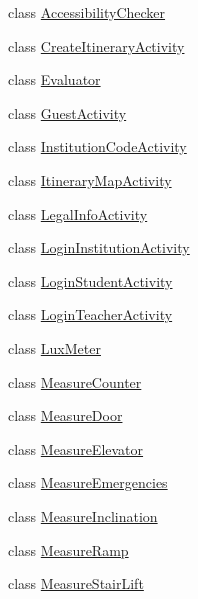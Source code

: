 \begin{DoxyCompactItemize}
\item 
class \mbox{\hyperlink{classcom_1_1osoc_1_1oncera_1_1_accessibility_checker}{Accessibility\+Checker}}
\item 
class \mbox{\hyperlink{classcom_1_1osoc_1_1oncera_1_1_create_itinerary_activity}{Create\+Itinerary\+Activity}}
\item 
class \mbox{\hyperlink{classcom_1_1osoc_1_1oncera_1_1_evaluator}{Evaluator}}
\item 
class \mbox{\hyperlink{classcom_1_1osoc_1_1oncera_1_1_guest_activity}{Guest\+Activity}}
\item 
class \mbox{\hyperlink{classcom_1_1osoc_1_1oncera_1_1_institution_code_activity}{Institution\+Code\+Activity}}
\item 
class \mbox{\hyperlink{classcom_1_1osoc_1_1oncera_1_1_itinerary_map_activity}{Itinerary\+Map\+Activity}}
\item 
class \mbox{\hyperlink{classcom_1_1osoc_1_1oncera_1_1_legal_info_activity}{Legal\+Info\+Activity}}
\item 
class \mbox{\hyperlink{classcom_1_1osoc_1_1oncera_1_1_login_institution_activity}{Login\+Institution\+Activity}}
\item 
class \mbox{\hyperlink{classcom_1_1osoc_1_1oncera_1_1_login_student_activity}{Login\+Student\+Activity}}
\item 
class \mbox{\hyperlink{classcom_1_1osoc_1_1oncera_1_1_login_teacher_activity}{Login\+Teacher\+Activity}}
\item 
class \mbox{\hyperlink{classcom_1_1osoc_1_1oncera_1_1_lux_meter}{Lux\+Meter}}
\item 
class \mbox{\hyperlink{classcom_1_1osoc_1_1oncera_1_1_measure_counter}{Measure\+Counter}}
\item 
class \mbox{\hyperlink{classcom_1_1osoc_1_1oncera_1_1_measure_door}{Measure\+Door}}
\item 
class \mbox{\hyperlink{classcom_1_1osoc_1_1oncera_1_1_measure_elevator}{Measure\+Elevator}}
\item 
class \mbox{\hyperlink{classcom_1_1osoc_1_1oncera_1_1_measure_emergencies}{Measure\+Emergencies}}
\item 
class \mbox{\hyperlink{classcom_1_1osoc_1_1oncera_1_1_measure_inclination}{Measure\+Inclination}}
\item 
class \mbox{\hyperlink{classcom_1_1osoc_1_1oncera_1_1_measure_ramp}{Measure\+Ramp}}
\item 
class \mbox{\hyperlink{classcom_1_1osoc_1_1oncera_1_1_measure_stair_lift}{Measure\+Stair\+Lift}}

\end{DoxyCompactItemize}
